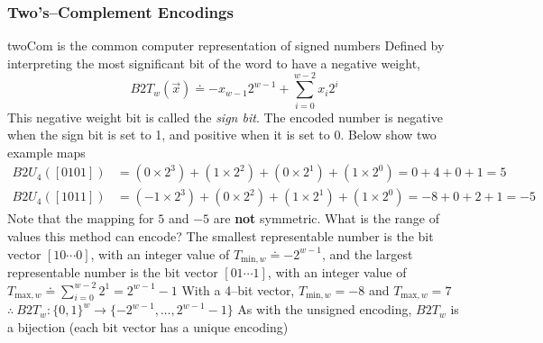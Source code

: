 \documentclass[../bryant_comp_sys.tex]{subfiles}
\begin{document}
            \subsubsection{Two's--Complement Encodings}
                \begin{outline}
                    \1 \Gls{twoCom} is the common computer representation of signed numbers
                        \2 Defined by interpreting the most significant bit of the word to have a negative weight,
                            \[
                                B2T_{w}(\overrightarrow{x}) \doteq -x_{w-1}2^{w-1} + \sum_{i=0}^{w-2} x_i 2^i
                            \]
                        \2 This negative weight bit is called the \textit{sign bit}. The encoded number is negative when the sign bit is set to 1, and positive when it is set to 0.
                        \2 Below show two example maps
                            \begin{align*}
                                B2U_4(\left[ 0101 \right]) &= \left( 0 \times 2^3 \right) + \left( 1 \times 2^2 \right) + \left( 0 \times 2^1 \right) + \left( 1 \times 2^0 \right) = 0 + 4 + 0 + 1 = 5 \\
                                B2U_4(\left[ 1011 \right]) &= \left( -1 \times 2^3 \right) + \left( 0 \times 2^2 \right) + \left( 1 \times 2^1 \right) + \left( 1 \times 2^0 \right) = -8 + 0 + 2 + 1 = -5
                            \end{align*}
                            \3 Note that the mapping for \( 5 \) and \( -5 \) are \textbf{not} symmetric.
                    \1 What is the range of values this method can encode?
                        \2 The smallest representable number is the bit vector \( \left[ 10 \cdots 0 \right] \), with an integer value of \( T_{\text{min}, w} \doteq -2^{w-1} \), and the largest representable number is the bit vector \( \left[ 01 \cdots 1\right] \), with an integer value of \( T_{\text{max}, w} \doteq \sum_{i=0}^{w-2} 2^1 = 2^{w-1} - 1 \)
                        \2 With a 4--bit vector, \( T_{\text{min}, w} = -8 \) and \( T_{\text{max}, w} = 7 \)
                        \2 \( \therefore~B2T_{w}: \{0,1\}^w \rightarrow \{-2^{w-1}, \ldots, 2^{w-1} - 1\} \)
                        \2 As with the unsigned encoding, \( B2T_w \) is a bijection (each bit vector has a unique encoding)
                \end{outline}
\end{document}
